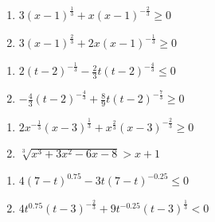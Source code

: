 \begin{multicols}{2}
\begin{enumerate}
\setcounter{enumi}{\value{HW}}


\item  $3(x-1)^{\frac{1}{3}} +x (x-1)^{-\frac{2}{3}} \geq 0$ %

\item $3(x-1)^{\frac{2}{3}} +2x (x-1)^{-\frac{1}{3}} \geq 0$ %

\setcounter{HW}{\value{enumi}}
\end{enumerate}
\end{multicols}


\begin{multicols}{2}
\begin{enumerate}
\setcounter{enumi}{\value{HW}}


\item  $2 (t-2)^{-\frac{1}{3}} -\frac{2}{3} t(t-2)^{-\frac{4}{3}} \leq 0$ 
\item  $-\frac{4}{3} (t-2)^{-\frac{4}{3}} + \frac{8}{9} t (t-2)^{-\frac{7}{3}} \geq 0$

\setcounter{HW}{\value{enumi}}
\end{enumerate}
\end{multicols}

\begin{multicols}{2}
\begin{enumerate}
\setcounter{enumi}{\value{HW}}


\item  $2x^{-\frac{1}{3}}(x-3)^{\frac{1}{3}} + x^{\frac{2}{3}} (x-3)^{-\frac{2}{3}} \geq 0$
\item $\sqrt[3]{x^{3} + 3x^{2} - 6x - 8} > x + 1$ 


\setcounter{HW}{\value{enumi}}
\end{enumerate}
\end{multicols}

\begin{multicols}{2}
\begin{enumerate}
\setcounter{enumi}{\value{HW}}

\item $4(7-t)^{0.75} - 3t(7-t)^{-0.25} \leq 0$   %

\item $4t^{0.75}(t - 3)^{-\frac{2}{3}} +9t^{-0.25}(t - 3)^{\frac{1}{3}} < 0$

\setcounter{HW}{\value{enumi}}
\end{enumerate}
\end{multicols}

